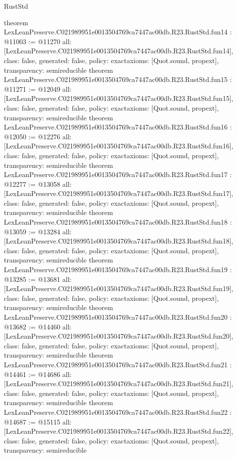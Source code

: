 \begin{lexlean}{RustStd}
\begin{coremodule}
{}
theorem LexLeanPreserve.C021989951e0013504769ca7447ac00db.R23.RustStd.fun14 : @11003 := @11270 {
  all: [LexLeanPreserve.C021989951e0013504769ca7447ac00db.R23.RustStd.fun14],
  class: false,
  generated: false,
  policy: exact{axioms: [Quot.sound, propext]},
  transparency: semireducible
}
theorem LexLeanPreserve.C021989951e0013504769ca7447ac00db.R23.RustStd.fun15 : @11271 := @12049 {
  all: [LexLeanPreserve.C021989951e0013504769ca7447ac00db.R23.RustStd.fun15],
  class: false,
  generated: false,
  policy: exact{axioms: [Quot.sound, propext]},
  transparency: semireducible
}
theorem LexLeanPreserve.C021989951e0013504769ca7447ac00db.R23.RustStd.fun16 : @12050 := @12276 {
  all: [LexLeanPreserve.C021989951e0013504769ca7447ac00db.R23.RustStd.fun16],
  class: false,
  generated: false,
  policy: exact{axioms: [Quot.sound, propext]},
  transparency: semireducible
}
theorem LexLeanPreserve.C021989951e0013504769ca7447ac00db.R23.RustStd.fun17 : @12277 := @13058 {
  all: [LexLeanPreserve.C021989951e0013504769ca7447ac00db.R23.RustStd.fun17],
  class: false,
  generated: false,
  policy: exact{axioms: [Quot.sound, propext]},
  transparency: semireducible
}
theorem LexLeanPreserve.C021989951e0013504769ca7447ac00db.R23.RustStd.fun18 : @13059 := @13284 {
  all: [LexLeanPreserve.C021989951e0013504769ca7447ac00db.R23.RustStd.fun18],
  class: false,
  generated: false,
  policy: exact{axioms: [Quot.sound, propext]},
  transparency: semireducible
}
theorem LexLeanPreserve.C021989951e0013504769ca7447ac00db.R23.RustStd.fun19 : @13285 := @13681 {
  all: [LexLeanPreserve.C021989951e0013504769ca7447ac00db.R23.RustStd.fun19],
  class: false,
  generated: false,
  policy: exact{axioms: [Quot.sound, propext]},
  transparency: semireducible
}
theorem LexLeanPreserve.C021989951e0013504769ca7447ac00db.R23.RustStd.fun20 : @13682 := @14460 {
  all: [LexLeanPreserve.C021989951e0013504769ca7447ac00db.R23.RustStd.fun20],
  class: false,
  generated: false,
  policy: exact{axioms: [Quot.sound, propext]},
  transparency: semireducible
}
theorem LexLeanPreserve.C021989951e0013504769ca7447ac00db.R23.RustStd.fun21 : @14461 := @14686 {
  all: [LexLeanPreserve.C021989951e0013504769ca7447ac00db.R23.RustStd.fun21],
  class: false,
  generated: false,
  policy: exact{axioms: [Quot.sound, propext]},
  transparency: semireducible
}
theorem LexLeanPreserve.C021989951e0013504769ca7447ac00db.R23.RustStd.fun22 : @14687 := @15115 {
  all: [LexLeanPreserve.C021989951e0013504769ca7447ac00db.R23.RustStd.fun22],
  class: false,
  generated: false,
  policy: exact{axioms: [Quot.sound, propext]},
  transparency: semireducible
}
\end{coremodule}
\end{lexlean}
